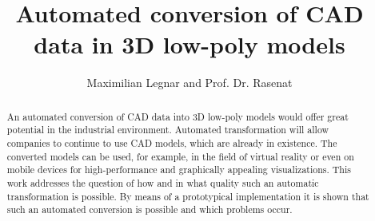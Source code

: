 \documentclass[a4paper, 10pt, journal]{wissarbIEEE}      %
\title{\LARGE \bf
Automated conversion of CAD data in 3D low-poly models
}
\author{Maximilian Legnar and Prof. Dr. Rasenat}%
\begin{document}
\maketitle

\begin{abstract}

An automated conversion of CAD data into 3D low-poly models would offer great potential in the industrial environment. Automated transformation will allow companies to continue to use CAD models, which are already in existence. The converted models can be used, for example, in the field of virtual reality or even on mobile devices for high-performance and graphically appealing visualizations. This work addresses the question of how and in what quality such an automatic transformation is possible. By means of a prototypical implementation it is shown that such an automated conversion is possible and which problems occur.

\end{abstract}
\end{document}
